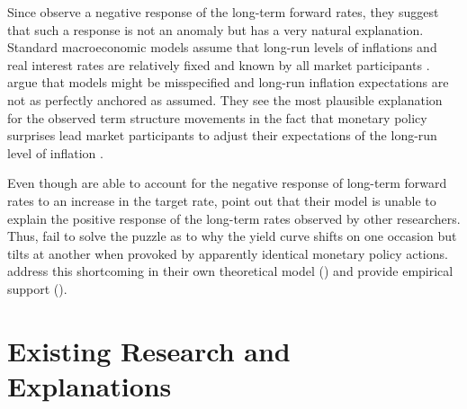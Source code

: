 \documentclass[11pt,a4paper,english,oneside]{book}
\numberwithin{equation}{chapter}
\begin{document}
Since \cite{Gurkaynak.2005} observe a negative response of the long-term forward rates, they suggest that such a response is not an anomaly but has a very natural explanation. 
Standard macroeconomic models assume that long-run levels of inflations and real interest rates are relatively fixed and known by all market participants \citep[p. 425]{Gurkaynak.2005}. \citeauthor{Gurkaynak.2005} argue that models might be misspecified and long-run inflation expectations are not as perfectly anchored as assumed. They see the most plausible explanation for the observed term structure movements in the fact that monetary policy surprises lead market participants to adjust their expectations of the long-run level of inflation \citep[pp. 434--435]{Gurkaynak.2005}.

Even though \cite{Gurkaynak.2005} are able to account for the negative response of long-term forward rates to an increase in the target rate, \citet[p. 2]{Ellingsen.2004} point out that their model is unable to explain the positive response of the long-term rates observed by other researchers. Thus, \cite{Gurkaynak.2005} fail to solve the puzzle as to why the yield curve shifts on one occasion but tilts at another when provoked by apparently identical monetary policy actions. \citeauthor{Ellingsen.2003} address this shortcoming in their own theoretical model (\citeyear{Ellingsen.2001}) and provide empirical support (\citeyear{Ellingsen.2003}). 


\section{Existing Research and Explanations} \label{ExistingResearch}
\end{document}
